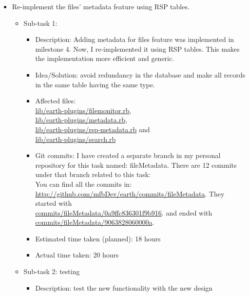 \begin{itemize}
	\item Re-implement the files' metadata feature using RSP tables.
	     \begin{itemize}
	      \item Sub-task 1: 
	           \begin{itemize}
					\item Description: Adding metadata for files feature was implemented in milestone 4. Now, I re-implemented it using RSP tables. This makes the implementation more efficient and generic.  
					\item Idea/Solution: avoid redundancy in the database and make all records in the same table having the same type.
					\item Affected files:\\ 
\href{http://github.com/mfbDev/earth/tree/master/lib/earth_plugins/file_monitor.rb}{lib/earth-plugins/filemonitor.rb},\\
\href{http://github.com/mfbDev/earth/tree/master/lib/earth_plugins/metadata.rb}{lib/earth-plugins/metadata.rb},\\
\href{http://github.com/mfbDev/earth/tree/master/lib/earth_plugins/rsp_metadata.rb}{lib/earth-plugins/rsp-metadata.rb} and\\
\href{http://github.com/mfbDev/earth/tree/master/lib/earth_plugins/search_by_kv_pairs.rb}{lib/earth-plugins/search.rb}
					\item Git commits: I have created a separate branch in my personal repository for this task named: fileMetadata. There are 12 commits under that branch related to this task:\\
You can find all the commits in: \href{http://github.com/mfbDev/earth/commits/fileMetadata}{http://github.com/mfbDev/earth/commits/fileMetadata}.
They started with \\
\href{http://github.com/mfbDev/earth/commits/fileMetadata/0a9ffc836301f9b916}{commits/fileMetadata/0a9ffc836301f9b916}.
and ended with \\
\href{http://github.com/mfbDev/earth/commits/fileMetadata/9063828060000a}{commits/fileMetadata/9063828060000a}. 
					\item Estimated time taken (planned): 18 hours
					\item Actual time taken: 20 hours
				\end{itemize}
			\item Sub-task 2: testing
			   \begin{itemize}
					\item Description: test the new functionality with the new design

\end{itemize}
\end{itemize}
\end{itemize}
